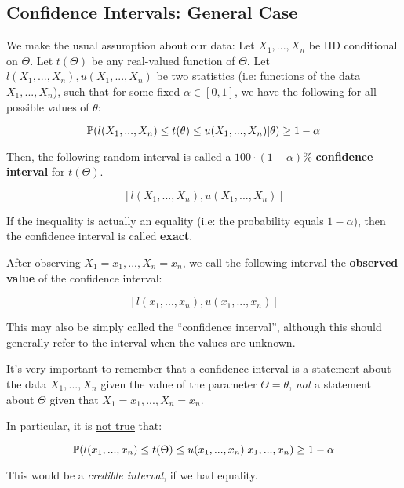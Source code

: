 \documentclass[a4paper]{article}
\begin{document}
        \subsection{Confidence Intervals: General Case}
            \begin{definition}
                We make the usual assumption about our data: Let $X_1, ..., X_n$
                be IID conditional on $\Theta$. Let $t(\Theta)$ be any
                real-valued function of $\Theta$. Let $l(X_1, ..., X_n), u(X_1,
                ..., X_n)$ be two statistics (i.e: functions of the data $X_1,
                ..., X_n$), such that for some fixed $\alpha \in [0, 1]$, we
                have the following for all possible values of $\theta$:

                \[
                    \mathbb{P}(l(X_1, ..., X_n) \leq t(\theta) \leq u(X_1, ...,
                    X_n) | \theta) \geq 1 - \alpha
                \]

                Then, the following random interval is called a $100 \cdot (1 -
                \alpha)$\% \textbf{confidence interval} for $t(\Theta)$.

                \[
                    [l(X_1, ..., X_n), u(X_1, ..., X_n)]
                \]

                If the inequality is actually an equality (i.e: the probability
                equals $1 - \alpha$), then the confidence interval is called
                \textbf{exact}.

                After observing $X_1 = x_1, ..., X_n = x_n$, we call the
                following interval the \textbf{observed value} of the confidence
                interval:

                \[
                    [l(x_1, ..., x_n), u(x_1, ..., x_n)]
                \]

                This may also be simply called the ``confidence interval'',
                although this should generally refer to the interval when the
                values are unknown.
            \end{definition}

            \begin{warn}
                It's very important to remember that a confidence interval is
                a statement about the data $X_1, ..., X_n$ given the value of
                the parameter $\Theta = \theta$, \textit{not} a statement about
                $\Theta$ given that $X_1 = x_1, ..., X_n = x_n$.

                In particular, it is \underline{not true} that:

                \[
                    \mathbb{P}(l(x_1, ..., x_n) \leq t(\Theta) \leq u(x_1, ...,
                    x_n) | x_1, ..., x_n) \geq 1 - \alpha
                \]

                This would be a \textit{credible interval}, if we had equality.
            \end{warn}
\end{document}
